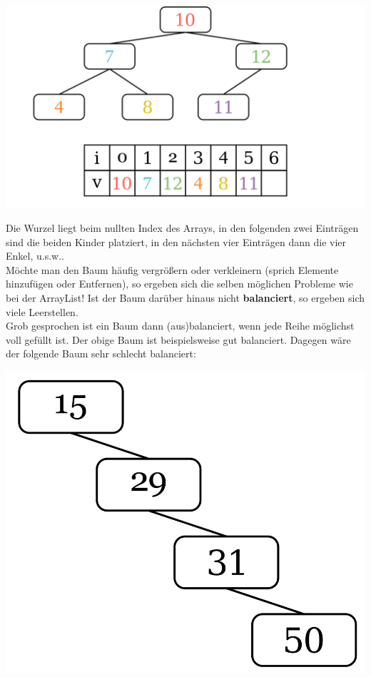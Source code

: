 \documentclass{article}
\begin{document}
\begin{center}
    \includegraphics[scale=0.15]{../media/einbettung.png}
\end{center}
Die Wurzel liegt beim nullten Index des Arrays, in den folgenden zwei Einträgen sind die beiden Kinder platziert, in den nächsten vier Einträgen dann die vier Enkel, u.s.w.. \\
Möchte man den Baum häufig vergrößern oder verkleinern (sprich Elemente hinzufügen oder Entfernen), so ergeben sich die selben möglichen Probleme wie bei der ArrayList! Ist der Baum darüber hinaus nicht \textbf{balanciert}, so ergeben sich viele Leerstellen. \\
Grob gesprochen ist ein Baum dann (aus)balanciert, wenn jede Reihe möglichst voll gefüllt ist. Der obige Baum ist beispielsweise gut balanciert. Dagegen wäre der folgende Baum sehr schlecht balanciert: 
\begin{center}
    \includegraphics[scale=0.15]{../media/linear.png}
\end{center}
\vspace{1mm}
\end{document}
